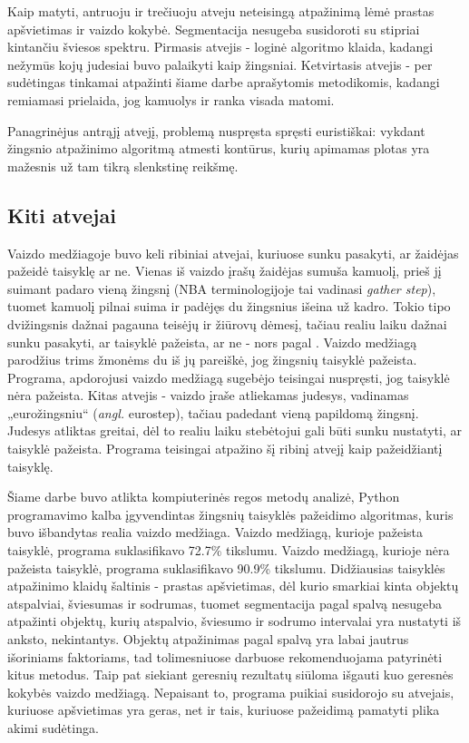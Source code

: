 \documentclass{VUMIFPSkursinis}
\begin{document}
Kaip matyti, antruoju ir trečiuoju atveju neteisingą atpažinimą lėmė prastas apšvietimas ir vaizdo kokybė. Segmentacija nesugeba susidoroti su stipriai kintančiu šviesos spektru. Pirmasis atvejis - loginė algoritmo klaida, kadangi nežymūs kojų judesiai buvo palaikyti kaip žingsniai. Ketvirtasis atvejis - per sudėtingas tinkamai atpažinti šiame darbe aprašytomis metodikomis, kadangi remiamasi prielaida, jog kamuolys ir ranka visada matomi.

Panagrinėjus antrąjį atvejį, problemą nuspręsta spręsti euristiškai: vykdant žingsnio atpažinimo algoritmą atmesti kontūrus, kurių apimamas plotas yra mažesnis už tam tikrą slenkstinę reikšmę. 

\subsection{Kiti atvejai}
 Vaizdo medžiagoje buvo keli ribiniai atvejai, kuriuose sunku pasakyti, ar žaidėjas pažeidė taisyklę ar ne. Vienas iš vaizdo įrašų žaidėjas sumuša kamuolį, prieš jį suimant padaro vieną žingsnį (NBA terminologijoje tai vadinasi \textit{gather step}), tuomet kamuolį pilnai suima ir padėjęs du žingsnius išeina už kadro. Tokio tipo dvižingsnis dažnai pagauna teisėjų ir žiūrovų dėmesį, tačiau realiu laiku dažnai sunku pasakyti, ar taisyklė pažeista, ar ne - nors pagal . Vaizdo medžiagą parodžius trims žmonėms du iš jų pareiškė, jog žingsnių taisyklė pažeista. Programa, apdorojusi vaizdo medžiagą sugebėjo teisingai nuspręsti, jog taisyklė nėra pažeista. Kitas atvejis - vaizdo įraše atliekamas judesys, vadinamas „eurožingsniu“ (\textit{angl.} eurostep), tačiau padedant vieną papildomą žingsnį. Judesys atliktas greitai, dėl to realiu laiku stebėtojui gali būti sunku nustatyti, ar taisyklė pažeista. Programa teisingai atpažino šį ribinį atvejį kaip pažeidžiantį taisyklę. 


Šiame darbe buvo atlikta kompiuterinės regos metodų analizė, Python programavimo kalba įgyvendintas žingsnių taisyklės pažeidimo algoritmas, kuris buvo išbandytas realia vaizdo medžiaga. Vaizdo medžiagą, kurioje pažeista taisyklė, programa suklasifikavo 72.7\% tikslumu. Vaizdo medžiagą, kurioje nėra pažeista taisyklė, programa suklasifikavo 90.9\% tikslumu. Didžiausias taisyklės atpažinimo klaidų šaltinis - prastas apšvietimas, dėl kurio smarkiai kinta objektų atspalviai, šviesumas ir sodrumas, tuomet segmentacija pagal spalvą nesugeba atpažinti objektų, kurių atspalvio, šviesumo ir sodrumo intervalai yra nustatyti iš anksto, nekintantys. Objektų atpažinimas pagal spalvą yra labai jautrus išoriniams faktoriams, tad tolimesniuose darbuose rekomenduojama patyrinėti kitus metodus. Taip pat siekiant geresnių rezultatų siūloma išgauti kuo geresnės kokybės vaizdo medžiagą.
Nepaisant to, programa puikiai susidorojo su atvejais, kuriuose apšvietimas yra geras, net ir tais, kuriuose pažeidimą pamatyti plika akimi sudėtinga. 
\end{document}
